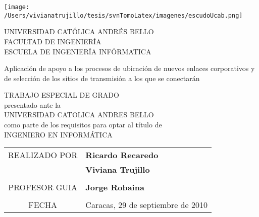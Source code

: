 \begin{center}
\parbox{4cm}{\texttt{[image: /Users/vivianatrujillo/tesis/svnTomoLatex/imagenes/escudoUcab.png]}  }\parbox{9cm}{\begin{center}
UNIVERSIDAD CAT\'OLICA ANDR\'ES BELLO \\
FACULTAD DE INGENIER\'IA \\
ESCUELA DE INGENIER\'IA INF\'ORMATICA \\
\end{center}}

\vspace{\fill}


\begin{LARGE}
Aplicaci\'on de apoyo a los procesos de ubicaci\'on de nuevos enlaces corporativos y de selecci\'on de los sitios de transmisi\'on a los que se conectar\'an\\
\end{LARGE}

\vspace{\fill}

TRABAJO ESPECIAL DE GRADO\\
presentado ante la\\
UNIVERSIDAD CATOLICA ANDRES BELLO\\
como parte de los requisitos para optar al t\'itulo de\\
INGENIERO EN INFORM\'ATICA

\vspace{\fill}

{
\begin{tabular}{cl}
REALIZADO POR & \textbf{Ricardo Recaredo}\tabularnewline
 & \textbf{Viviana Trujillo}\tabularnewline
\multicolumn{2}{c}{}\tabularnewline
PROFESOR GUIA & \textbf{Jorge Robaina}\tabularnewline
\multicolumn{2}{c}{}\tabularnewline
FECHA & Caracas, 29 de septiembre de 2010\tabularnewline
\end{tabular}
}


\end{center}